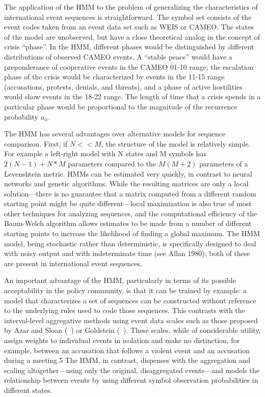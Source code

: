 \documentclass[graybox]{svmult}
\begin{document}
The application of the HMM to the problem of generalizing the characteristics of
international event sequences is straightforward. The symbol set consists of the event codes
taken from an event data set such as WEIS or CAMEO. The states of the model are unobserved,
but have a close theoretical analog in the concept of crisis ``phase''. In the
HMM, different phases would be distinguished by different distributions of observed CAMEO
events. A ``stable peace'' would have a preponderance of cooperative events in the CAMEO 01-10
range; the escalation phase of the crisis would be characterized by events in the 11-15 range
(accusations, protests, denials, and threats), and a phase of active hostilities would show events
in the 18-22 range. The length of time that a crisis spends in a particular phase would be
proportional to the magnitude of the recurrence probability $a_{ii}$.

The HMM has several advantages over alternative models for sequence comparison. First, if
$N<<M$, the structure of the model is relatively simple. For example a left-right model with N
states and M symbols has $2(N-1) + N*M$ parameters compared to the $M(M+2)$ parameters of a
Levenshtein metric. HMMs can be estimated very quickly, in contrast to neural networks and
genetic algorithms. While the resulting matrices are only a local solution---there is no guarantee
that a matrix computed from a different random starting point might be quite different---local
maximization is also true of most other techniques for analyzing sequences, and the computational
efficiency of the Baum-Welch algorithm allows estimates to be made from a number of different
starting points to increase the likelihood of finding a global maximum. The HMM model, being
stochastic rather than deterministic, is specifically designed to deal with noisy output and with
indeterminate time (see Allan 1980); both of these are present in international event sequences.

An important advantage of the HMM, particularly in terms of its possible acceptability in
the policy community, is that it can be trained by example: a model that characterizes a set of
sequences can be constructed without reference to the underlying rules used to code those
sequences. This contrasts with the interval-level aggregative methods using event data scales
such as those proposed by Azar and Sloan (~\cite{AzarSloan75}) or Goldstein (~\cite{Goldstein92}). These scales, while of
considerable utility, assign weights to individual events in isolation and make no distinction, for
example, between an accusation that follows a violent event and an accusation during a meeting.5
The HMM, in contrast, dispenses with the aggregation and scaling altogether---using only the
original, disaggregated events---and models the relationship between events by using different
symbol observation probabilities in different states.
\end{document}
